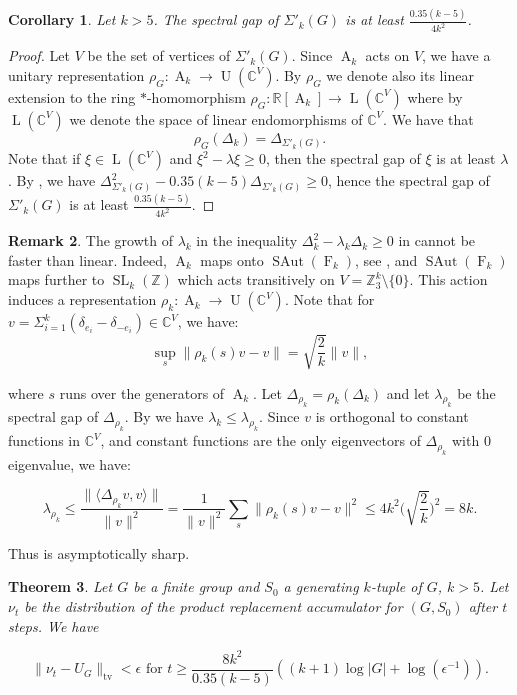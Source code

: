 \documentclass[12pt]{amsart}
\newtheorem{theorem}{Theorem}[section]
\newtheorem{corollary}[theorem]{Corollary}
\theoremstyle{definition}
\newtheorem{remark}[theorem]{Remark}
\numberwithin{figure}{section}
\numberwithin{table}{section}
\numberwithin{equation}{section}
\newcommand{\la}{\langle}
\newcommand{\ra}{\rangle}
\newcommand{\OP}[1]{\operatorname{#1}}
\newcommand{\SAut}{\operatorname{SAut}}
\newcommand{\F}{\operatorname{F}}
\newcommand{\A}{\operatorname{A}}
\newcommand{\BB}[1]{{\mathbb #1}}
\begin{document}
\begin{corollary}\label{c:spectral-gap}
Let $k>5$. The spectral gap of $\Sigma'_k(G)$ is at least $\frac{0.35(k-5)}{4k^2}$.
\end{corollary}

\begin{proof}
Let $V$ be the set of vertices of $\Sigma'_k(G)$. Since $\A_k$ acts on $V$, we have a unitary representation $\rho_G \colon \A_k \to \OP{U}(\BB C^V)$. By $\rho_G$ we denote also its linear extension to the ring $*$-homomorphism $\rho_G \colon \BB R [\A_k] \to \OP{L}(\BB C^V)$ where by $\OP{L}(\BB C^V)$ we denote the space of linear endomorphisms of $\BB C^V$. We have that 
$$\rho_G(\Delta_k) = \Delta_{\Sigma'_k(G)}.$$
Note that if $\xi \in \OP{L}(\BB C^V)$ and $\xi^2-\lambda \xi \geq 0$, then the spectral gap of $\xi$ is at least $\lambda$. By  , we have $\Delta_{\Sigma'_k(G)}^2 - 0.35(k-5)\Delta_{\Sigma'_k(G)} \geq 0$, hence the spectral gap of $\Sigma'_k(G)$ is at least $\frac{0.35(k-5)}{4k^2}$.
\end{proof}

\begin{remark}\label{r:sharp}
The growth of $\lambda_k$ in the inequality $\Delta_k^2 - \lambda_k\Delta_k \geq 0$ in  cannot be faster than linear. Indeed, $\A_k$ maps onto $\SAut(\F_k)$, see  , and $\SAut(\F_k)$ maps further to $\OP{SL}_k(\BB Z)$ which acts transitively on $V = \BB Z_3^k \setminus \{0\}$. This action induces a representation $\rho_k \colon \A_k \to \OP{U}(\BB C^V)$. 
Note that for $v = \Sigma_{i=1}^k (\delta_{e_i} - \delta_{-e_i}) \in \BB C^V$, we have: 
$$\sup_{s} \|\rho_k(s)v-v
\|= \sqrt{\frac{2}{k}}\|v\|,$$

where $s$ runs over the generators of $\A_k$. Let $\Delta_{\rho_k} = \rho_k(\Delta_k)$ and let $\lambda_{\rho_k}$ be the spectral gap of $\Delta_{\rho_k}$. By  we have $\lambda_k \leq \lambda_{\rho_k}$. Since $v$ is orthogonal to constant functions in $\BB C^V$, and constant functions are the only eigenvectors of $\Delta_{\rho_k}$ with $0$ eigenvalue, we have: 

$$
\lambda_{\rho_k} \leq \frac{\|\la \Delta_{\rho_k} v,v \ra \|}{\|v\|^2} = \frac{1}{\|v\|^2}\sum_{s}\|\rho_k(s)v-v\|^2 \leq 4k^2\Big(\sqrt{\frac{2}{k}}\Big)^2 = 8k.
$$ 

Thus  is asymptotically sharp. 
\end{remark}

\begin{theorem}\label{t:rate-of-convergence}
Let $G$ be a finite group and $S_0$ a generating $k$-tuple of $G$, $k>5$. Let $\nu_t$ be the distribution of the product replacement accumulator for $(G,S_0)$ after $t$ steps. We have

$$
\|\nu_t - U_G\|_{\mathrm{tv}} < \epsilon \text{ for } t \geq \frac{8k^2}{0.35(k-5)}((k+1)\log|G| + \log(\epsilon^{-1})).
$$
\end{theorem}
\end{document}
